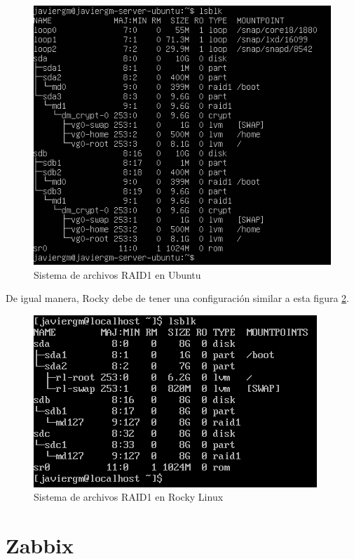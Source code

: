 \begin{figure}[H]
  \centering
  \includegraphics[scale=0.9]{Captura1}
  \caption{Sistema de archivos RAID1 en Ubuntu}
  \label{fig:lsblk-ubuntu}
\end{figure}

De igual manera, Rocky debe de tener una configuración similar a esta figura \ref{fig:lsblk-rocky}.\\

\begin{figure}[H]
  \centering
  \includegraphics[scale=0.9]{Captura2}
  \caption{Sistema de archivos RAID1 en Rocky Linux}
  \label{fig:lsblk-rocky}
\end{figure}

\section{Zabbix}

